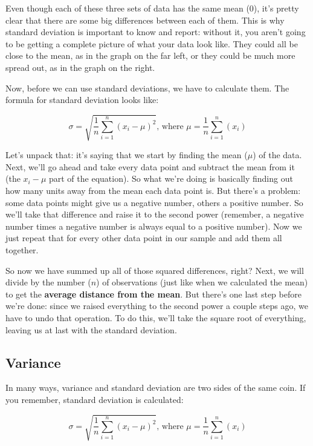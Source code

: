 Even though each of these three sets of data has the same mean (0), it's pretty clear that there are some big differences between each of them. This is why standard deviation is important to know and report: without it, you aren't going to be getting a complete picture of what your data look like. They could all be close to the mean, as in the graph on the far left, or they could be much more spread out, as in the graph on the right.

Now, before we can use standard deviations, we have to calculate them. The formula for standard deviation looks like:

\begin{equation*}
\sigma = \sqrt{
	\frac{1}{n}\sum_{i=1}^n\left(x_i-\mu\right)^2
	} \text{, where }
	\mu=\frac{1}{n}\sum_{i=1}^n(x_i)
\end{equation*}

Let's unpack that: it's saying that we start by finding the mean (\( \mu \)) of the data. Next, we'll go ahead and take every data point and subtract the mean from it (the \( x_i-\mu \) part of the equation). So what we're doing is basically finding out how many units away from the mean each data point is. But there's a problem: some data points might give us a negative number, others a positive number. So we'll take that difference and raise it to the second power (remember, a negative number times a negative number is always equal to a positive number). Now we just repeat that for every other data point in our sample and add them all together.

So now we have summed up all of those squared differences, right? Next, we will divide by the number (\( n \)) of observations (just like when we calculated the mean) to get the \textbf{average distance from the mean}. But there's one last step before we're done: since we raised everything to the second power a couple steps ago, we have to undo that operation. To do this, we'll take the square root of everything, leaving us at last with the standard deviation.

\subsection{Variance}
In many ways, variance and standard deviation are two sides of the same coin. If you remember, standard deviation is calculated:

    \[ \sigma = \sqrt{\frac{1}{n}\sum_{i=1}^n\left(x_i-\mu\right)^2}\text{, where } \mu=\frac{1}{n}\sum_{i=1}^n(x_i) \]

